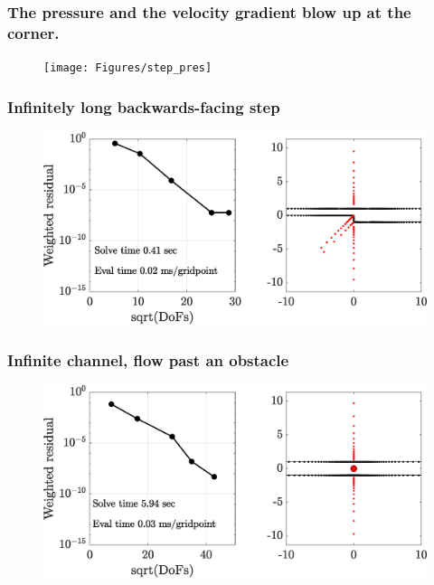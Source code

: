 \begin{frame}
\frametitle{The pressure and the velocity gradient blow up at the corner.}
\centering
\begin{figure}
	\texttt{[image: Figures/step\_pres]}
\end{figure}
\end{frame}


\begin{frame}
\frametitle{Infinitely long backwards-facing step}
\centering
\begin{figure}
	\vfill
	\includegraphics[height=0.3\linewidth]{Figures/chan_conv}
\end{figure}
\end{frame}


\begin{frame}
\frametitle{Infinite channel, flow past an obstacle}
\centering
\begin{figure}

\includegraphics[height=0.3\linewidth]{Figures/cyl_conv}
\end{figure}
\end{frame}


